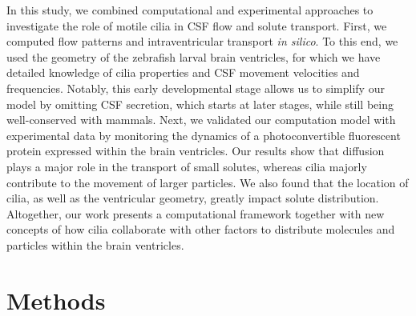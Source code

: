 \documentclass[fleqn]{wlscirep}
\begin{document}
In this study, we combined computational and experimental approaches to investigate
the role of motile cilia in CSF flow and solute transport.
First, we computed flow patterns and intraventricular transport \emph{in silico}. To
this end, we used the geometry of the zebrafish larval brain ventricles,
for which we have detailed knowledge of cilia properties and CSF movement velocities
and frequencies. Notably, this early developmental stage allows us to simplify our model
by omitting CSF secretion, which starts at later stages, while still being well-conserved with mammals.
Next, we validated our computation model with experimental data by monitoring
the dynamics of a photoconvertible fluorescent protein expressed within the brain ventricles.
Our results show that diffusion plays a major role in the transport of small solutes,
whereas cilia majorly contribute to the movement of larger particles.
We also found that the location of cilia, as well as the ventricular geometry, greatly
impact solute distribution. Altogether, our work presents a computational
framework together with new concepts of how cilia
collaborate with other factors to distribute molecules and
particles within the brain ventricles. 

\section*{Methods}
\end{document}
